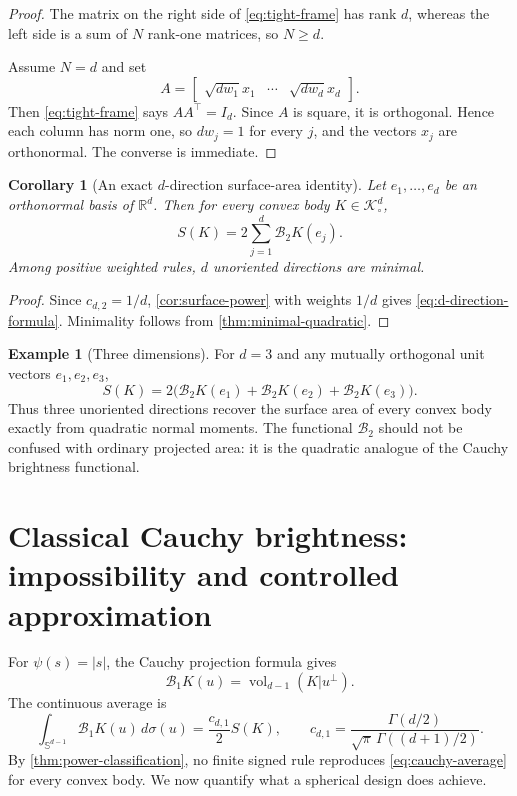 \documentclass[12pt,a4paper]{article}
\newcommand{\Sph}{\mathbb S}
\newcommand{\R}{\mathbb R}
\newcommand{\K}{\mathcal K}
\newcommand{\cB}{\mathcal B}
\theoremstyle{plain}
\newtheorem{corollary}[theorem]{Corollary}
\theoremstyle{definition}
\newtheorem{example}[theorem]{Example}
\begin{document}
\begin{proof}
The matrix on the right side of \eqref{eq:tight-frame} has rank $d$, whereas the left side is a sum of $N$ rank-one matrices, so $N\ge d$.

Assume $N=d$ and set
\[
 A=\begin{bmatrix}\sqrt{dw_1}x_1&\cdots&\sqrt{dw_d}x_d\end{bmatrix}.
\]
Then \eqref{eq:tight-frame} says $AA^\top=I_d$.  Since $A$ is square, it is orthogonal.  Hence each column has norm one, so $dw_j=1$ for every $j$, and the vectors $x_j$ are orthonormal.  The converse is immediate.
\end{proof}

\begin{corollary}[An exact $d$-direction surface-area identity]\label{cor:d-directions}
Let $e_1,\ldots,e_d$ be an orthonormal basis of $\R^d$.  Then for every convex body $K\in\K^d_\circ$,
\begin{equation}\label{eq:d-direction-formula}
 \boxed{
 S(K)=2\sum_{j=1}^d\cB_2K(e_j).
 }
\end{equation}
Among positive weighted rules, $d$ unoriented directions are minimal.
\end{corollary}

\begin{proof}
Since $c_{d,2}=1/d$, \cref{cor:surface-power} with weights $1/d$ gives \eqref{eq:d-direction-formula}.  Minimality follows from \cref{thm:minimal-quadratic}.
\end{proof}

\begin{example}[Three dimensions]
For $d=3$ and any mutually orthogonal unit vectors $e_1,e_2,e_3$,
\[
 S(K)=2\bigl(\cB_2K(e_1)+\cB_2K(e_2)+\cB_2K(e_3)\bigr).
\]
Thus three unoriented directions recover the surface area of every convex body exactly from quadratic normal moments.  The functional $\cB_2$ should not be confused with ordinary projected area: it is the quadratic analogue of the Cauchy brightness functional.
\end{example}

\section{Classical Cauchy brightness: impossibility and controlled approximation}

For $\psi(s)=|s|$, the Cauchy projection formula gives
\begin{equation}\label{eq:cauchy-brightness}
 \cB_1K(u)=\operatorname{vol}_{d-1}(K|u^\perp).
\end{equation}
The continuous average is
\begin{equation}\label{eq:cauchy-average}
 \int_{\Sph^{d-1}}\cB_1K(u)\,d\sigma(u)
 =\frac{c_{d,1}}2S(K),
 \qquad
 c_{d,1}=\frac{\Gamma(d/2)}{\sqrt\pi\,\Gamma((d+1)/2)}.
\end{equation}
By \cref{thm:power-classification}, no finite signed rule reproduces \eqref{eq:cauchy-average} for every convex body.  We now quantify what a spherical design does achieve.
\end{document}
